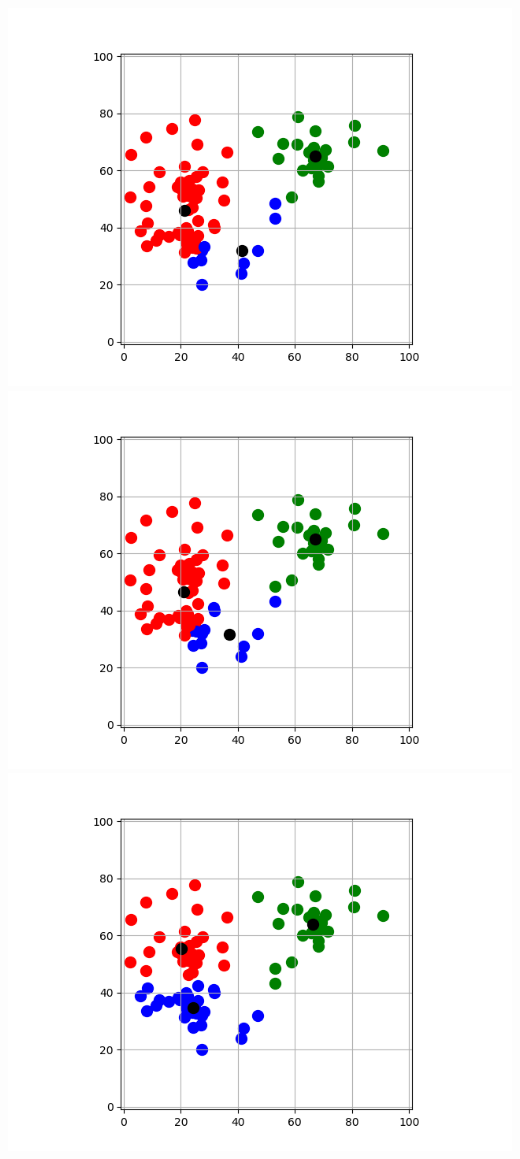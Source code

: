 \documentclass[11pt,class=report,crop=false]{standalone}
\begin{document}
\begin{activite}[Barycentres]
\begin{enumerate}
\begin{center}
	\end{center}	
	\begin{center}
	\includegraphics[scale=\myscale,scale=0.32]{ecran_barycentres_exemple_05}
	\includegraphics[scale=\myscale,scale=0.32]{ecran_barycentres_exemple_06}
	\includegraphics[scale=\myscale,scale=0.32]{ecran_barycentres_exemple_09}
	\end{center}	


\end{enumerate}
\end{activite}
\end{document}
